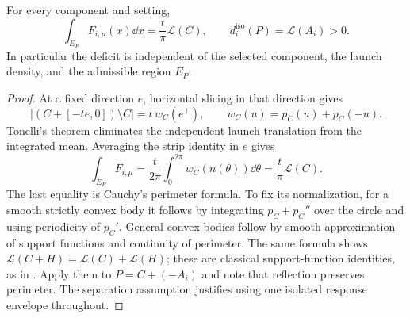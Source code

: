 \begin{lemma}
\label{lem:isotropic-perimeter}
For every component and setting,
\begin{equation}\label{eq:isotropic-perimeter}
 \int_{E_P}F_{i,\mu}(x)\dd x=\frac{t}{\pi}\mathcal L(C),
 \qquad d_i^{\mathrm{iso}}(P)=\mathcal L(A_i)>0.
\end{equation}
In particular the deficit is independent of the selected component,
the launch density, and the admissible region $E_P$.
\end{lemma}
\begin{proof}
At a fixed direction $e$, horizontal slicing in that direction gives
\[
 |(C+[-te,0])\setminus C|=t\,w_C(e^\perp),
 \qquad w_C(u)=p_C(u)+p_C(-u).
\]
Tonelli's theorem eliminates the independent launch translation from
the integrated mean. Averaging the strip identity in $e$ gives
\[
 \int_{E_P}F_{i,\mu}
        =\frac{t}{2\pi}\int_0^{2\pi}w_C(n(\theta))\dd\theta
        =\frac{t}{\pi}\mathcal L(C).
\]
The last equality is Cauchy's perimeter formula. To fix its
normalization, for a smooth strictly convex body it follows by
integrating $p_C+p_C''$ over the circle and using periodicity of
$p_C'$. General convex bodies follow by smooth approximation of
support functions and continuity of perimeter. The same formula
shows $\mathcal L(C+H)=\mathcal L(C)+\mathcal L(H)$; these are
classical support-function identities, as in \cite{Schneider}.
Apply them to $P=C+(-A_i)$ and note that reflection preserves
perimeter. The separation assumption justifies using one isolated
response envelope throughout.
\end{proof}

